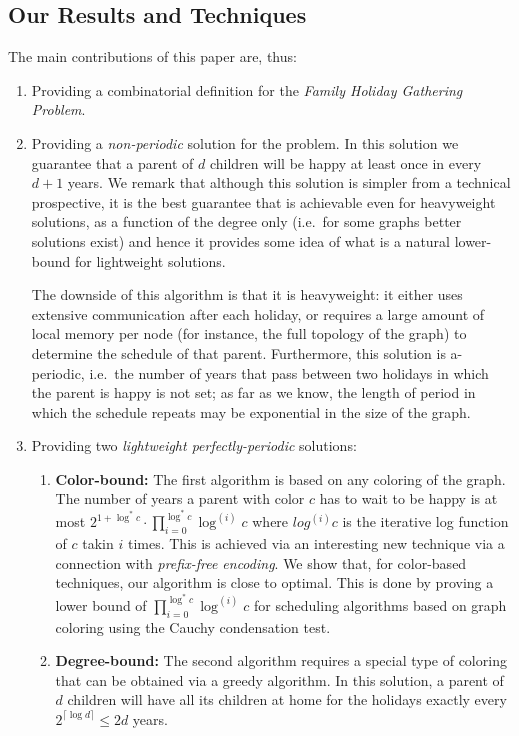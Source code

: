\documentclass[11pt]{article}
\begin{document}
\subsection{Our Results and Techniques}
The main contributions of this paper are, thus:
\begin{enumerate}
\item Providing a combinatorial definition for the {\em Family Holiday
 Gathering Problem}.
\item Providing a \emph{non-periodic} solution for the
  problem. In this solution we guarantee that a parent of $d$ children
  will be happy at least once in every $d+1$ years. We remark that although this solution is simpler from a technical prospective, it is the best guarantee that is achievable even for heavyweight solutions, as a function of the degree only (i.e.\ for some graphs better solutions exist) and hence it provides some idea of what is a natural lower-bound for lightweight solutions.

 The downside of this algorithm is that it is heavyweight:  it either uses extensive
 communication after each holiday, or requires a large  amount of
 local memory per node (for instance, the full topology of the graph) to determine the schedule of that parent. Furthermore, this solution is a-periodic,
 i.e.\ the number of years that pass between two holidays in which the
 parent is happy is not set;
as far as we know, the length of period in which the schedule repeats may be exponential in the size of the graph.

\item Providing two {\em lightweight perfectly-periodic} solutions:
\begin{enumerate}
\item
{\bf Color-bound:} The first algorithm is based on any coloring of the
graph. The number of years a parent with color $c$ has to wait to be happy
is at most $2^{1+\log^*c}\cdot\prod_{i=0}^{\log^*c} \log^{(i)}c$ where $log^{(i)} c$ is the iterative log function of $c$ takin $i$ times. This is achieved via an interesting
new technique via a connection with {\em prefix-free encoding}. We show that, for color-based techniques, our algorithm is {close to}
optimal. This is done by proving a lower bound of $\prod_{i=0}^{\log^*c} \log^{(i)}c$ for scheduling algorithms based on
graph coloring using the Cauchy condensation test.
\item
{\bf Degree-bound:} The second algorithm requires a special type of
coloring that can be obtained via a greedy algorithm. In this
solution, a parent of $d$ children will have all its children at home
for the holidays exactly every $2^{\lceil \log d \rceil} \leq 2d$
years.
 \end{enumerate}
\end{enumerate}
\end{document}
